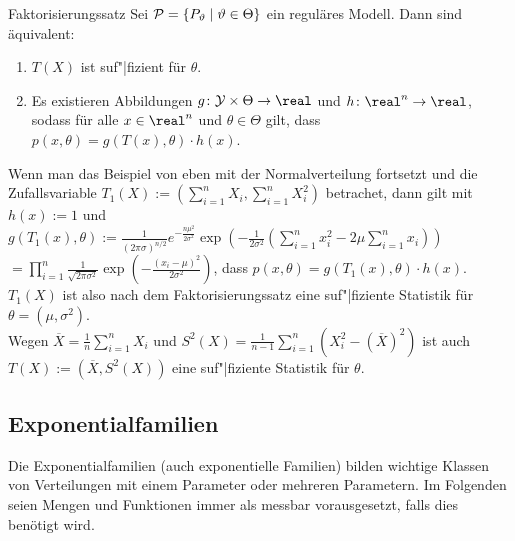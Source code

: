 \begin{Satz}{Faktorisierungssatz}
    Sei $\P = \{P_\theta \;|\; \theta \in \Theta\}$ ein reguläres Modell.
    Dann sind äquivalent:
    \begin{enumerate}
        \item
        $T(X)$ ist suf"|fizient für $\theta$.

        \item
        Es existieren Abbildungen $g\colon \Y \times \Theta \rightarrow \real$
        und $h\colon \real^n \rightarrow \real$, sodass
        für alle $x \in \real^n$ und $\theta \in \Theta$ gilt, dass
        $p(x, \theta) = g(T(x), \theta) \cdot h(x)$.
    \end{enumerate}
\end{Satz}

\linie

\begin{Bsp}
    Wenn man das Beispiel von eben mit der Normalverteilung fortsetzt und die Zufallsvariable
    $T_1(X) := (\sum_{i=1}^n X_i, \sum_{i=1}^n X_i^2)$ betrachet,
    dann gilt mit $h(x) := 1$ und\\
    $g(T_1(x), \theta) := \frac{1}{(2\pi\sigma)^{n/2}} e^{-\frac{n\mu^2}{2\sigma^2}}
    \exp\!\left(-\frac{1}{2\sigma^2}
    \left(\sum_{i=1}^n x_i^2 - 2\mu \sum_{i=1}^n x_i\right)\right)$\\
    $= \prod_{i=1}^n \frac{1}{\sqrt{2\pi\sigma^2}}
    \exp\!\left(-\frac{(x_i - \mu)^2}{2\sigma^2}\right)$, dass
    $p(x, \theta) = g(T_1(x), \theta) \cdot h(x)$.\\
    $T_1(X)$ ist also nach dem Faktorisierungssatz eine suf"|fiziente Statistik für
    $\theta = (\mu, \sigma^2)$.\\
    Wegen $\overline{X} = \frac{1}{n} \sum_{i=1}^n X_i$ und
    $S^2(X) = \frac{1}{n-1} \sum_{i=1}^n (X_i^2 - (\overline{X})^2)$ ist auch
    $T(X) := (\overline{X}, S^2(X))$ eine suf"|fiziente Statistik für $\theta$.
\end{Bsp}

\subsection{%
    Exponentialfamilien%
}

\begin{Bem}
    Die Exponentialfamilien (auch exponentielle Familien) bilden wichtige Klassen von Verteilungen
    mit einem Parameter oder mehreren Parametern.
    Im Folgenden seien Mengen und Funktionen immer als messbar vorausgesetzt, falls dies
    benötigt wird.
\end{Bem}

